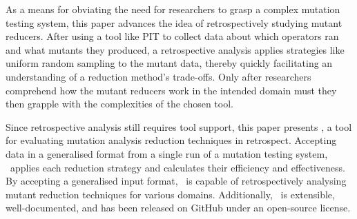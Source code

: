 


As a means for obviating the need for researchers to grasp a complex mutation testing system, this paper advances the
idea of retrospectively studying mutant reducers.  After using a tool like PIT to collect data about which operators ran
and what mutants they produced, a retrospective analysis applies strategies like uniform random sampling to the mutant
data, thereby quickly facilitating an understanding of a reduction method's trade-offs. Only after researchers
comprehend how the mutant reducers work in the intended domain must they then grapple with the complexities of the
chosen tool.


Since retrospective analysis still requires tool support, this paper presents \mr, a tool for evaluating mutation
analysis reduction techniques in retrospect. Accepting data in a generalised format from a single run of a mutation
testing system, \mr~applies each reduction strategy and calculates their efficiency and effectiveness.  By accepting a
generalised input format, \mr~is capable of retrospectively analysing mutant reduction techniques for various domains.
Additionally, \mr~is extensible, well-documented, and has been released on GitHub under an open-source license.







